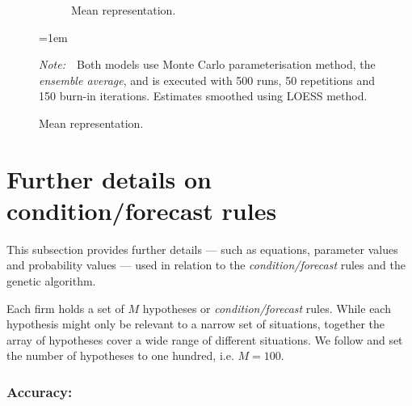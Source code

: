 \documentclass[preprint, 12pt]{elsarticle}
\newcommand{\Figtext}[1]{%
	\begin{tablenotes}[para,flushleft]
		\hangindent=1em
		\footnotesize
		\raggedright
		#1
	\end{tablenotes}
}
\newcommand{\Fignote}[1]{\Figtext{\emph{Note:~}~#1}}
\begin{document}
\begin{figure}[ht!]
\begin{subfigure}[t]{0.315\textwidth}
		\caption{Mean representation.}
		\label{fig:asys_representation_maxcovrnd}
	\end{subfigure}

	\label{fig:asys_maxcovrnd}
	\Fignote{Both models use Monte Carlo parameterisation method, the \emph{ensemble average}, and is executed with 500 runs, 50 repetitions and 150 burn-in iterations. Estimates smoothed using LOESS method.}
\end{figure}

\section{Further details on condition/forecast rules}
\label{app:details}

This subsection provides further details — such as equations, parameter values and probability values — used in relation to the \emph{condition/forecast} rules and the genetic algorithm.

Each firm holds a set of $M$ hypotheses or \emph{condition/forecast} rules. While each hypothesis might only be relevant to a narrow set of situations, together the array of hypotheses cover a wide range of different situations. We follow \citet[chapter~3]{Arthur_2014} and set the number of hypotheses to one hundred, i.e. $M=100$.

\subsubsection*{Accuracy:}
\end{document}
